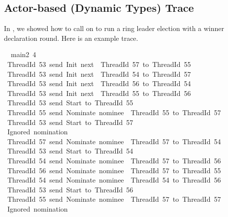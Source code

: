 \documentclass[sigplan,screen]{acmart}
\begin{document}
\subsection{Actor-based (Dynamic Types) Trace}
\label{apx:main2-trace}

In , we showed how to call  on
 to run a ring leader election with a winner declaration round.
%
Here is an example trace.

\scriptsize

\begin{tabbing}\ttfamily
~~main2~4\\
\ttfamily ~ThreadId~53~send~Init~next~~ThreadId~57~to~ThreadId~55\\
\ttfamily ~ThreadId~53~send~Init~next~~ThreadId~54~to~ThreadId~57\\
\ttfamily ~ThreadId~53~send~Init~next~~ThreadId~56~to~ThreadId~54\\
\ttfamily ~ThreadId~53~send~Init~next~~ThreadId~55~to~ThreadId~56\\
\ttfamily ~ThreadId~53~send~Start~to~ThreadId~55\\
\ttfamily ~ThreadId~55~send~Nominate~nominee~~ThreadId~55~to~ThreadId~57\\
\ttfamily ~ThreadId~53~send~Start~to~ThreadId~57\\
\ttfamily ~Ignored~nomination\\
\ttfamily ~ThreadId~57~send~Nominate~nominee~~ThreadId~57~to~ThreadId~54\\
\ttfamily ~ThreadId~53~send~Start~to~ThreadId~54\\
\ttfamily ~ThreadId~54~send~Nominate~nominee~~ThreadId~57~to~ThreadId~56\\
\ttfamily ~ThreadId~56~send~Nominate~nominee~~ThreadId~57~to~ThreadId~55\\
\ttfamily ~ThreadId~54~send~Nominate~nominee~~ThreadId~54~to~ThreadId~56\\
\ttfamily ~ThreadId~53~send~Start~to~ThreadId~56\\
\ttfamily ~ThreadId~55~send~Nominate~nominee~~ThreadId~57~to~ThreadId~57\\
\ttfamily ~Ignored~nomination\\

\end{tabbing}
\end{document}
